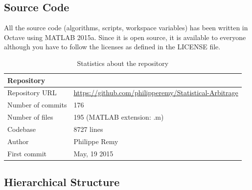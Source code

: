 \documentclass[11pt,a4,twosided,singlespacing,titlepagenumber=on]{scrreprt}
\numberwithin{equation}{chapter} %
\theoremstyle{remark}
\begin{document}
\subsection{Source Code}
All the source code (algorithms, scripts, workspace variables) has been written in Octave using MATLAB 2015a. Since it is open source, it is available to everyone although you have to follow the licenses as defined in the LICENSE file.

\renewcommand{\arraystretch}{1}%
\begin{table}[H]
\centering
\begin{tabular}{|ll|}
\hline
\multicolumn{1}{|l}{\textbf{Repository}}     & \multicolumn{1}{l|}{} \\ \hline
Repository URL 					   &  \url{https://github.com/philipperemy/Statistical-Arbitrage} \\
Number of commits   			 &  176 \\
Number of files   				 &  195 (MATLAB extension: .m) \\
Codebase   				         &  8727 lines\\
Author          &  Philippe Remy \\
First commit & May, 19 2015 \\
\hline
\end{tabular}
\caption{Statistics about the repository}
\label{Statistics_repository}
\end{table}

\subsection{Hierarchical Structure}
\end{document}
